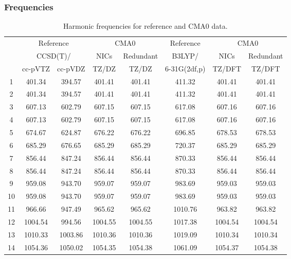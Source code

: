 \documentclass[10pt,oneside]{article}
\begin{document}
\begin{table}[h!]
\subsubsection*{Frequencies}
\centering
\caption{Harmonic frequencies for reference and CMA0 data.}
\begin{tabular}{cccccccc}
\toprule
{} & \multicolumn{2}{c}{Reference} & \multicolumn{2}{c}{CMA0} &    Reference & \multicolumn{2}{c}{CMA0} \\
{} & \multicolumn{2}{c}{CCSD(T)/} &    NICs &  Redundant &       B3LYP/ &    NICs & Redundant \\
{} &   cc-pVTZ & cc-pVDZ &   TZ/DZ &      TZ/DZ & 6-31G(2df,p) &  TZ/DFT &    TZ/DFT \\
\midrule
1  &    401.34 &  394.57 &  401.41 &     401.41 &       411.32 &  401.41 &    401.41 \\
2  &    401.34 &  394.57 &  401.41 &     401.41 &       411.32 &  401.41 &    401.41 \\
3  &    607.13 &  602.79 &  607.15 &     607.15 &       617.08 &  607.16 &    607.16 \\
4  &    607.13 &  602.79 &  607.15 &     607.15 &       617.08 &  607.16 &    607.16 \\
5  &    674.67 &  624.87 &  676.22 &     676.22 &       696.85 &  678.53 &    678.53 \\
6  &    685.29 &  676.65 &  685.29 &     685.29 &       720.37 &  685.29 &    685.29 \\
7  &    856.44 &  847.24 &  856.44 &     856.44 &       870.33 &  856.44 &    856.44 \\
8  &    856.44 &  847.24 &  856.44 &     856.44 &       870.33 &  856.44 &    856.44 \\
9  &    959.08 &  943.70 &  959.07 &     959.07 &       983.69 &  959.03 &    959.03 \\
10 &    959.08 &  943.70 &  959.07 &     959.07 &       983.69 &  959.03 &    959.03 \\
11 &    966.66 &  947.49 &  965.62 &     965.62 &      1010.76 &  963.82 &    963.82 \\
12 &   1004.54 &  994.56 & 1004.55 &    1004.55 &      1017.38 & 1004.54 &   1004.54 \\
13 &   1010.33 & 1003.86 & 1010.36 &    1010.36 &      1019.09 & 1010.34 &   1010.34 \\
14 &   1054.36 & 1050.02 & 1054.35 &    1054.38 &      1061.09 & 1054.37 &   1054.38 \\

\end{tabular}
\end{table}
\end{document}
